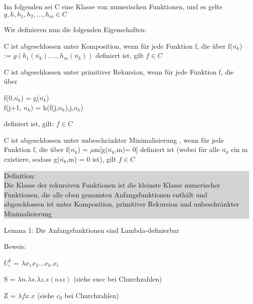 \documentclass[10pt]{article}
\begin{document}
\begin{itemize*}
  \item Im folgenden sei C eine Klasse von numerischen Funktionen, und es gelte $g,h,h_1,h_2,…,h_m \in C$
  \item Wir definieren nun die folgenden Eigenschaften:
  \begin{itemize*}
    \item C ist \color{blue} abgeschlossen unter Komposition\color{black}, wenn für jede Funktion f, die über f($\overline{n_k}$) := $g(h_1(\overline{n_k}),…,h_m(\overline{n_k}))$ definiert ist, gilt $f \in C$
    \item C ist \color{blue} abgeschlossen unter primitiver Rekursion\color{black}, wenn für jede Funktion f, die über
    \begin{center}
      f(0,$\overline{n_k}$) = g($\overline{n_k}$) \\
      f(j+1, $\overline{n_k}$) = h(f(j,$\overline{n_k}$),j,$\overline{n_k}$)
    \end{center}
    definiert ist, gilt: $f \in C$
    \item C ist \color{blue} abgeschlossen unter unbeschränkter Minimalisierung \color{black}, wenn für jede Funktion f, die über f($\overline{n_k}$) = $\mu$m[g($\overline{n_k}$,m)= 0] definiert ist (wobei für alle $\overline{n_k}$ ein m existiere, sodass g($\overline{n_k}$,m) = 0 ist), gilt $f \in C$
  \end{itemize*}
\end{itemize*}

\colorbox{lightgray}{\begin{minipage}[h]{1.0\linewidth}
    Definition: \\
    Die Klasse der rekursiven Funktionen ist die kleinste Klasse numerischer Funktionen, die alle oben genannten Anfangsfunktionen enthält und abgeschlossen ist unter Komposition, primitiver Rekursion und unbeschränkter Minimalisierung
  \end{minipage}}
\newline 
\begin{itemize*}
  \item \color{blue} Lemma 1: Die Anfangsfunktionen sind Lambda-definierbar \color{black}
  \item Beweis:
  \begin{itemize*}
    \item $U_i^k$ = $\lambda x_1 x_2 … x_k.x_i$
    \item S = $\lambda n.\lambda s. \lambda z.s(nsz)$ (siehe succ bei Churchzahlen)
    \item Z = $\lambda fx.x$ (siehe $c_0$ bei Churchzahlen)
  \end{itemize*}
\end{itemize*}
\end{document}
